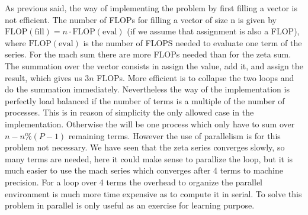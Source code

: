 As previous said, the way of implementing the problem by first filling a vector is not efficient. The number of FLOPs for filling a vector of size n is given by $\text{FLOP}(\text{fill}) = n \cdot \text{FLOP}(\text{eval})$ (if we assume that assignment is also a FLOP), where $\text{FLOP}(\text{eval})$ is the number of FLOPS needed to evaluate one term of the series. For the mach sum there are more FLOPs needed than for the zeta sum. The summation over the vector consists in assign the value, add it, and assign the result, which gives us $3n$ FLOPs. More efficient is to collapse the two loops and do the summation immediately. Nevertheless the way of the implementation is perfectly load balanced if the number of terms is a multiple of the number of processes. This is in reason of simplicity the only allowed case in the implementation. Otherwise the will be one process which only have to sum over $n - n \% (P-1)$ remaining terms.
However the use of parallelism is for this problem not necessary. We have seen that the zeta series converges slowly, so many terms are needed, here it could make sense to parallize the loop, but it is much easier to use the mach series which converges after 4 terms to machine precision. For a loop over 4 terms the overhead to organize the parallel environment is much more time expensive as to compute it in serial. To solve this problem in parallel is only useful as an exercise for learning purpose. 






